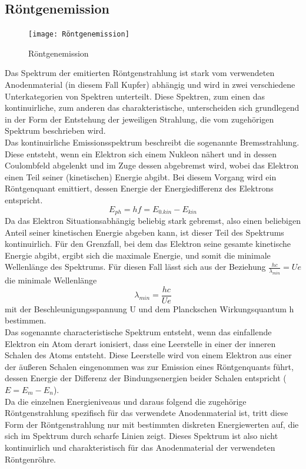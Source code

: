 \subsection{Röntgenemission}
\begin{figure}[h]
    \centering
    \texttt{[image: Röntgenemission]}
    \caption{Röntgenemission}
\end{figure}
Das Spektrum der emitierten Röntgenstrahlung ist stark vom verwendeten Anodenmaterial (in diesem Fall Kupfer) abhängig und wird in zwei verschiedene Unterkategorien von Spektren unterteilt. Diese Spektren, zum einen das kontinuirliche, zum anderen das charakteristische, unterscheiden sich grundlegend in der Form der Entstehung der jeweiligen Strahlung, die vom zugehörigen Spektrum beschrieben wird. \\
Das kontinuirliche Emissionsspektrum beschreibt die sogenannte Bremsstrahlung. Diese entsteht, wenn ein Elektron sich einem Nukleon nähert und in dessen Coulombfeld abgelenkt und im Zuge dessen abgebremst wird, wobei das Elektron einen Teil seiner (kinetischen) Energie abgibt. Bei diesem Vorgang wird ein Röntgenquant emittiert, dessen Energie der Energiedifferenz des Elektrons entspricht.
\begin{equation}
E_{ph}=hf=E_{0.kin}-E_{kin}
\end{equation}
Da das Elektron Situationsabhängig beliebig stark gebremst, also einen beliebigen Anteil seiner kinetischen Energie abgeben kann, ist dieser Teil des Spektrums kontinuirlich. Für den Grenzfall, bei dem das Elektron seine gesamte kinetische Energie abgibt, ergibt sich die maximale Energie, und somit die minimale Wellenlänge des Spektrums. Für diesen Fall lässt sich aus der Beziehung $\frac{hc}{\lambda_{min}}=Ue$ die minimale Wellenlänge
\begin{equation}
\lambda_{min}=\frac{hc}{Ue}
\end{equation}
mit der Beschleunigungsspannung U und dem Planckschen Wirkungsquantum h bestimmen. \\
Das sogenannte characteristische Spektrum entsteht, wenn das einfallende Elektron ein Atom derart ionisiert, dass eine Leerstelle in einer der inneren Schalen des Atoms entsteht. Diese Leerstelle wird von einem Elektron aus einer der äußeren Schalen eingenommen was zur Emission eines Röntgenquants führt, dessen Energie der Differenz der Bindungsenergien beider Schalen entspricht ($E=E_m-E_n$). \\
Da die einzelnen Energieniveaus und daraus folgend die zugehörige Röntgenstrahlung spezifisch für das verwendete Anodenmaterial ist, tritt diese Form der Röntgenstrahlung nur mit bestimmten diskreten Energiewerten auf, die sich im Spektrum durch scharfe Linien zeigt. Dieses Spektrum ist also nicht kontinuirlich und charakteristisch für das Anodenmaterial der verwendeten Röntgenröhre. \\
